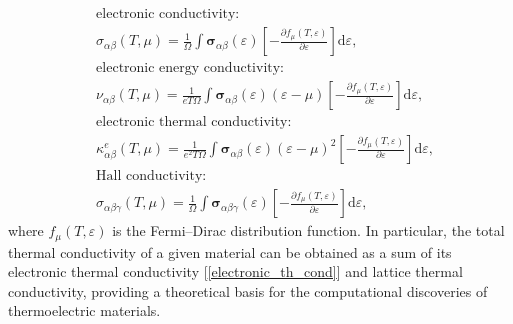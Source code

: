\begin{subequations}
\begin{align}
&\mbox{electronic conductivity:}\nonumber  \\  &\sigma_{\alpha\beta}(T,\mu)=\frac{1}{\Omega}\int\bm{\sigma}_{\alpha\beta}(\varepsilon)\left[-\frac{\partial f_{\mu}(T,\varepsilon)}{\partial \varepsilon}\right]\mbox{d}\varepsilon, \label{electronic_cond}\\
&\mbox{electronic energy conductivity:}\nonumber\\     &\nu_{\alpha\beta}(T,\mu)=\frac{1}{eT\Omega}\int\bm{\sigma}_{\alpha\beta}(\varepsilon)(\varepsilon-\mu)\left[-\frac{\partial f_{\mu}(T,\varepsilon)}{\partial \varepsilon}\right]\mbox{d}\varepsilon, \label{electronic_energy_cond}\\
&\mbox{electronic thermal conductivity:}\nonumber\\    &\kappa_{\alpha\beta}^{e}(T,\mu)=\frac{1}{e^2T\Omega}\int\bm{\sigma}_{\alpha\beta}(\varepsilon)(\varepsilon-\mu)^2\left[-\frac{\partial f_{\mu}(T,\varepsilon)}{\partial \varepsilon}\right]\mbox{d}\varepsilon,\label{electronic_th_cond}\\
&\mbox{Hall conductivity:}\nonumber\\    &\sigma_{\alpha\beta\gamma}(T,\mu)=\frac{1}{\Omega}\int\bm{\sigma}_{\alpha\beta\gamma}(\varepsilon)\left[-\frac{\partial f_{\mu}(T,\varepsilon)}{\partial \varepsilon}\right]\mbox{d}\varepsilon, \label{Hall_cond}
\end{align}
\end{subequations}
where $f_{\mu}(T,\varepsilon)$ is the Fermi--Dirac distribution function. In particular, the total thermal conductivity of a given material can be obtained as a sum of its electronic thermal conductivity [\cref{electronic_th_cond}] and lattice thermal conductivity, providing a theoretical basis for the computational discoveries of thermoelectric materials.\cite{yang2008evaluation,hong2016full,zhang2017titanium,wang2017exceptional}

